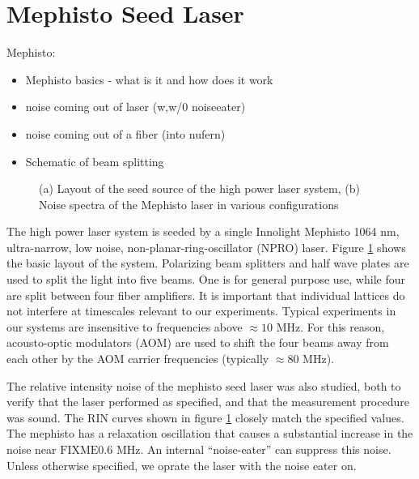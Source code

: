 \documentclass[twocolumn,aps,pra,showpacs,preprintnumbers,bibnotes]{revtex4-1}
\newcommand\FIXME{{\color{red}\ensuremath{\mathrm{FIXME}}}}
\begin{document}
\section{Mephisto Seed Laser}

Mephisto:
\begin{itemize}
	\item Mephisto basics - what is it and how does it work
	\item noise coming out of laser (w,w/0 noiseeater)
	\item noise coming out of a fiber (into nufern)
	\item Schematic of beam splitting
\end{itemize}

\begin{figure}
    \caption{(a) Layout of the seed source of the high power laser system, (b) Noise spectra of the Mephisto laser in various configurations}\label{fig:seed}
\end{figure}

The high power laser system is seeded by a single Innolight Mephisto 1064 nm, ultra-narrow, low noise, non-planar-ring-oscillator (NPRO) laser. Figure \ref{fig:seed} shows the basic layout of the system. Polarizing beam splitters and half wave plates are used to split the light into five beams. One is for general purpose use, while four are split between four fiber amplifiers. It is important that individual lattices do not interfere at timescales relevant to our experiments. Typical experiments in our systems are insensitive to frequencies above $\approx 10$ MHz. For this reason, acousto-optic modulators (AOM) are used to shift the four beams away from each other by the AOM carrier frequencies (typically $\approx 80$ MHz). 

The relative intensity noise of the mephisto seed laser was also studied, both to verify that the laser performed as specified, and that the measurement procedure was sound. The RIN curves shown in figure \ref{fig:seed} closely match the specified values. The mephisto has a relaxation oscillation that causes a substantial increase in the noise near \FIXME 0.6 MHz. An internal ``noise-eater'' can suppress this noise. Unless otherwise specified, we oprate the laser with the noise eater on.
\end{document}
